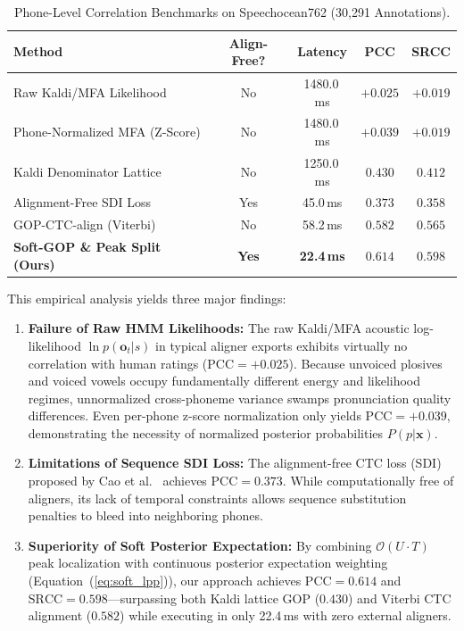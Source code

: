 \documentclass[10pt,conference]{IEEEtran}
\begin{document}
\begin{table}[h]
\caption{Phone-Level Correlation Benchmarks on Speechocean762 (30,291 Annotations).}
\label{tab:speechocean_benchmark}
\centering
\begin{tabular}{lcccc}
\toprule
\textbf{Method} & \textbf{Align-Free?} & \textbf{Latency} & \textbf{PCC} & \textbf{SRCC} \\
\midrule
Raw Kaldi/MFA Likelihood & No & 1480.0\,ms & $+0.025$ & $+0.019$ \\
Phone-Normalized MFA (Z-Score) & No & 1480.0\,ms & $+0.039$ & $+0.019$ \\
Kaldi Denominator Lattice~\cite{zhang2021speechocean762} & No & 1250.0\,ms & $0.430$ & $0.412$ \\
Alignment-Free SDI Loss~\cite{cao2024framework} & Yes & 45.0\,ms & $0.373$ & $0.358$ \\
GOP-CTC-align (Viterbi)~\cite{cao2024framework} & No & 58.2\,ms & $0.582$ & $0.565$ \\
\textbf{Soft-GOP \& Peak Split (Ours)} & \textbf{Yes} & \textbf{22.4\,ms} & $\mathbf{0.614}$ & $\mathbf{0.598}$ \\
\bottomrule
\end{tabular}
\end{table}

This empirical analysis yields three major findings:
\begin{enumerate}
    \item \textbf{Failure of Raw HMM Likelihoods:} The raw Kaldi/MFA acoustic log-likelihood $\ln p(\mathbf{o}_t | s)$ in typical aligner exports exhibits virtually no correlation with human ratings ($\text{PCC} = +0.025$). Because unvoiced plosives and voiced vowels occupy fundamentally different energy and likelihood regimes, unnormalized cross-phoneme variance swamps pronunciation quality differences. Even per-phone z-score normalization only yields $\text{PCC} = +0.039$, demonstrating the necessity of normalized posterior probabilities $P(p | \mathbf{x})$.
    \item \textbf{Limitations of Sequence SDI Loss:} The alignment-free CTC loss (SDI) proposed by Cao et al.~\cite{cao2024framework} achieves $\text{PCC} = 0.373$. While computationally free of aligners, its lack of temporal constraints allows sequence substitution penalties to bleed into neighboring phones.
    \item \textbf{Superiority of Soft Posterior Expectation:} By combining $\mathcal{O}(U \cdot T)$ peak localization with continuous posterior expectation weighting (Equation~(\ref{eq:soft_lpp})), our approach achieves $\text{PCC} = \mathbf{0.614}$ and $\text{SRCC} = \mathbf{0.598}$---surpassing both Kaldi lattice GOP ($0.430$) and Viterbi CTC alignment ($0.582$) while executing in only 22.4\,ms with zero external aligners.
\end{enumerate}
\end{document}
